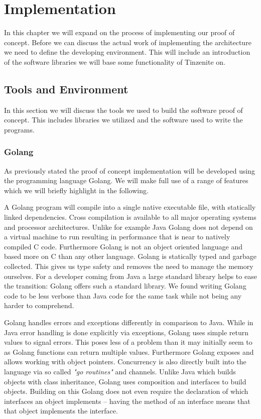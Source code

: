 \chapter{Implementation}
\label{chap:Implementation}

In this chapter we will expand on the process of implementing our proof of concept.
Before we can discuss the actual work of implementing the architecture we need to define the developing environment.
This will include an introduction of the software libraries we will base some functionality of Tinzenite on.

\section{Tools and Environment}
\label{sec:Tools and Environment}

In this section we will discuss the tools we used to build the software proof of concept.
This includes libraries we utilized and the software used to write the programs.

\subsection{Golang}
\label{sub:Golang}

As previously stated the proof of concept implementation will be developed using the programming language Golang.
We will make full use of a range of features which we will briefly highlight in the following.

A Golang program will compile into a single native executable file, with statically linked dependencies.
Cross compilation is available to all major operating systems and processor architectures.
Unlike for example Java Golang does not depend on a virtual machine to run resulting in performance that is near to natively compiled C code.
Furthermore Golang is not an object oriented language and based more on C than any other language.
Golang is statically typed and garbage collected.
This gives us type safety and removes the need to manage the memory ourselves.
For a developer coming from Java a large standard library helps to ease the transition: Golang offers such a standard library.
We found writing Golang code to be less verbose than Java code for the same task while not being any harder to comprehend.

Golang handles errors and exceptions differently in comparison to Java.
While in Java error handling is done explicitly via exceptions, Golang uses simple return values to signal errors.
This poses less of a problem than it may initially seem to as Golang functions can return multiple values.
Furthermore Golang exposes and allows working with object pointers.
Concurrency is also directly built into the language via so called \textit{"go routines"} and channels.
Unlike Java which builds objects with class inheritance, Golang uses composition and interfaces to build objects.
Building on this Golang does not even require the declaration of which interfaces an object implements -- having the method of an interface means that that object implements the interface.

